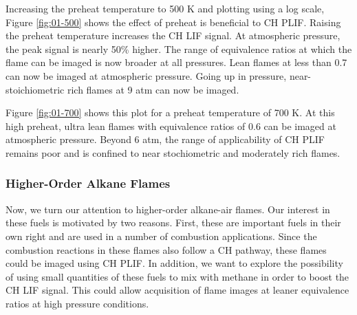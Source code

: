 

Increasing the preheat temperature to 500 K and plotting using a log scale, Figure \ref{fig:01-500} shows the effect of preheat is beneficial to CH PLIF.
Raising the preheat temperature increases the CH LIF signal.
At atmospheric pressure, the peak signal is nearly 50\% higher.
The range of equivalence ratios at which the flame can be imaged is now broader at all pressures.
Lean flames at less than 0.7 can now be imaged at atmospheric pressure.
Going up in pressure, near-stoichiometric rich flames at 9 atm can now be imaged.



Figure \ref{fig:01-700} shows this plot for a preheat temperature of 700 K.
At this high preheat, ultra lean flames with equivalence ratios of 0.6 can be imaged at atmospheric pressure.
Beyond 6 atm, the range of applicability of CH PLIF remains poor and is confined to near stochiometric and moderately rich flames.



\subsubsection{Higher-Order Alkane Flames}

Now, we turn our attention to higher-order alkane-air flames.
Our interest in these fuels is motivated by two reasons.
First, these are important fuels in their own right and are used in a number of combustion applications.
Since the combustion reactions in these flames also follow a CH pathway, these flames could be imaged using CH PLIF.
In addition, we want to explore the possibility of using small quantities of these fuels to mix with methane in order to boost the CH LIF signal.
This could allow acquisition of flame images at leaner equivalence ratios at high pressure conditions.

